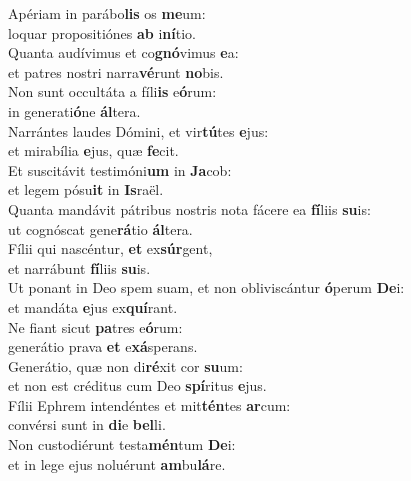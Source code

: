 \evenverse Apériam in parábo\textbf{lis} os \textbf{me}um:~\*\\
\evenverse loquar propositiónes \textbf{ab} i\textbf{ní}tio.\\
\oddverse Quanta audívimus et co\textbf{gnó}vimus \textbf{e}a:~\*\\
\oddverse et patres nostri narra\textbf{vé}runt \textbf{no}bis.\\
\evenverse Non sunt occultáta a fíli\textbf{is} e\textbf{ó}rum:~\*\\
\evenverse in generati\textbf{ó}ne \textbf{ál}tera.\\
\oddverse Narrántes laudes Dómini, et vir\textbf{tú}tes \textbf{e}jus:~\*\\
\oddverse et mirabília \textbf{e}jus, quæ \textbf{fe}cit.\\
\evenverse Et suscitávit testimóni\textbf{um} in \textbf{Ja}cob:~\*\\
\evenverse et legem pósu\textbf{it} in \textbf{Is}raël.\\
\oddverse Quanta mandávit pátribus nostris nota fácere ea \textbf{fí}liis \textbf{su}is:~\*\\
\oddverse ut cognóscat gene\textbf{rá}tio \textbf{ál}tera.\\
\evenverse Fílii qui nascéntur, \textbf{et} ex\textbf{súr}gent,~\*\\
\evenverse et narrábunt \textbf{fí}liis \textbf{su}is.\\
\oddverse Ut ponant in Deo spem suam, et non obliviscántur \textbf{ó}perum \textbf{De}i:~\*\\
\oddverse et mandáta \textbf{e}jus ex\textbf{quí}rant.\\
\evenverse Ne fiant sicut \textbf{pa}tres e\textbf{ó}rum:~\*\\
\evenverse generátio prava \textbf{et} e\textbf{xá}sperans.\\
\oddverse Generátio, quæ non di\textbf{ré}xit cor \textbf{su}um:~\*\\
\oddverse et non est créditus cum Deo \textbf{spí}ritus \textbf{e}jus.\\
\evenverse Fílii Ephrem intendéntes et mit\textbf{tén}tes \textbf{ar}cum:~\*\\
\evenverse convérsi sunt in \textbf{di}e \textbf{bel}li.\\
\oddverse Non custodiérunt testa\textbf{mén}tum \textbf{De}i:~\*\\
\oddverse et in lege ejus noluérunt \textbf{am}bu\textbf{lá}re.\\
